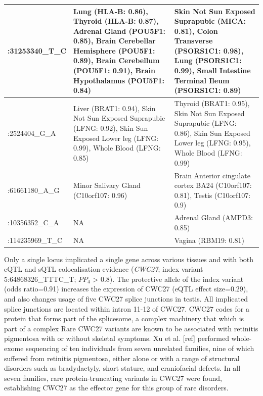 \begin{longtable}[t]{l>{\raggedright\arraybackslash}p{10em}>{\raggedright\arraybackslash}p{10em}}
  \midrule
  \addlinespace
  \begingroup\fontsize{9}{11}\selectfont 6:31253340\_T\_C\endgroup & \begingroup\fontsize{9}{11}\selectfont Lung (HLA-B: 0.86), Thyroid (HLA-B: 0.87), Adrenal Gland (POU5F1: 0.85), Brain Cerebellar Hemisphere (POU5F1: 0.89), Brain Cerebellum (POU5F1: 0.91), Brain Hypothalamus (POU5F1: 0.84)\endgroup & \begingroup\fontsize{9}{11}\selectfont Skin Not Sun Exposed Suprapubic (MICA: 0.81), Colon Transverse (PSORS1C1: 0.98), Lung (PSORS1C1: 0.99), Small Intestine Terminal Ileum (PSORS1C1: 0.89)\endgroup\\
  \midrule
  \begingroup\fontsize{9}{11}\selectfont 7:2524404\_G\_A\endgroup & \begingroup\fontsize{9}{11}\selectfont Liver (BRAT1: 0.94), Skin Not Sun Exposed Suprapubic (LFNG: 0.92), Skin Sun Exposed Lower leg (LFNG: 0.99), Whole Blood (LFNG: 0.85)\endgroup & \begingroup\fontsize{9}{11}\selectfont Thyroid (BRAT1: 0.95), Skin Not Sun Exposed Suprapubic (LFNG: 0.86), Skin Sun Exposed Lower leg (LFNG: 0.95), Whole Blood (LFNG: 0.99)\endgroup\\
  \midrule
  \begingroup\fontsize{9}{11}\selectfont 10:61661180\_A\_G\endgroup & \begingroup\fontsize{9}{11}\selectfont Minor Salivary Gland (C10orf107: 0.96)\endgroup & \begingroup\fontsize{9}{11}\selectfont Brain Anterior cingulate cortex BA24 (C10orf107: 0.81), Testis (C10orf107: 0.9)\endgroup\\
  \midrule
  \begingroup\fontsize{9}{11}\selectfont 11:10356352\_C\_A\endgroup & \begingroup\fontsize{9}{11}\selectfont NA\endgroup & \begingroup\fontsize{9}{11}\selectfont Adrenal Gland (AMPD3: 0.85)\endgroup\\
  \midrule
  \begingroup\fontsize{9}{11}\selectfont 12:114235969\_T\_C\endgroup & \begingroup\fontsize{9}{11}\selectfont NA\endgroup & \begingroup\fontsize{9}{11}\selectfont Vagina (RBM19: 0.81)\endgroup\\*
  \end{longtable}

  Only a single locus implicated a single gene across various tissues and with both eQTL and sQTL colocalisation evidence (\textit{CWC27}; index variant 5:64868326\_TTTC\_T; $PP_{4}$ > 0.8). The protective allele of the index variant (odds ratio=0.91) increases the expression of CWC27 (eQTL effect size=0.29), and also changes usage of five CWC27 splice junctions in testis. All implicated splice junctions are located within intron 11-12 of CWC27. CWC27 codes for a protein that forms part of the splicesome, a complex machinery that  which is part of a complex Rare CWC27 variants are known to be associated with retinitis pigmentosa with or without skeletal symptoms. Xu et al. [ref] performed whole-exome sequencing of ten individuals from seven unrelated families, nine of which suffered from retinitis pigmentosa, either alone or with a range of structural disorders such as bradydactyly, short stature, and craniofacial defects. In all seven families, rare protein-truncating variants in CWC27 were found, establishing CWC27 as the effector gene for this group of rare disorders. 



